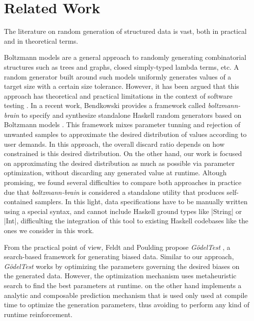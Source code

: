 \section{Related Work}

The literature on random generation of structured data is vast, both in
practical and in theoretical terms.

%
%
Boltzmann models \cite{Duchon2004} are a general approach to randomly generating
combinatorial structures such as trees and graphs, closed simply-typed lambda
terms, etc.
%
A random generator built around such models uniformly generates values of a
target size with a certain size tolerance.
%
However, it has been argued that this approach has theoretical and practical
limitations in the context of software testing \cite{feldt2013}.
%
In a recent work, Bendkowski provides a framework called \emph{boltzmann-brain}
to specify and synthesize standalone Haskell random generators based on
Boltzmann models \cite{bendkowski2018}.
%
This framework mixes parameter tunning and rejection of unwanted samples to
approximate the desired distribution of values according to user demands.
%
In this approach, the overall discard ratio depends on how constrained is this
desired distribution.
%
On the other hand, our work is focused on approximating the desired distribution
as much as possible via parameter optimization, without discarding any generated
value at runtime.
%
Altough promising, we found several difficulties to compare both approaches in
practice due that \emph{boltzmann-brain} is considered a standalone utility that
produces self-contained samplers.
%
In this light, data specifications have to be manually written using a special
syntax, and cannot include Haskell ground types like |String| or |Int|,
difficulting the integration of this tool to existing Haskell codebases like the
ones we consider in this work.



%
%
From the practical point of view, Feldt and Poulding propose \emph{G\"odelTest}
\cite{feldt2013}, a search-based framework for generating biased data.
%
%
Similar to our approach, \emph{G\"odelTest} works by optimizing the parameters
governing the desired biases on the generated data.
%
However, the optimization mechanism uses metaheuristic search to find the best
parameters at runtime.
%
\dragenp on the other hand implements a analytic and composable prediction
mechanism that is used only used at compile time to optimize the generation
parameters, thus avoiding to perform any kind of runtime reinforcement.


